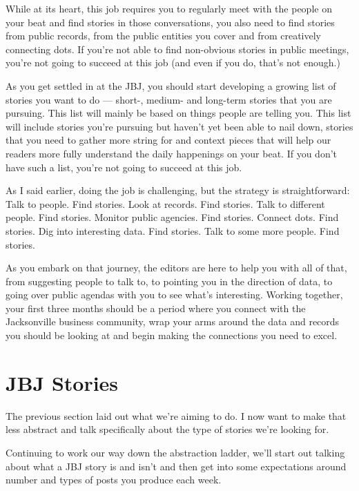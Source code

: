 \documentclass[
  11pt,
  american,
  letterpaperpaper,
  extrafontsizes,onecolumn,openright
  ]{memoir}
\begin{document}
While at its heart, this job requires you to regularly meet with the people on your beat and find stories in those conversations, you also need to find stories from public records, from the public entities you cover and from creatively connecting dots. If you're not able to find non-obvious stories in public meetings, you're not going to succeed at this job (and even if you do, that's not enough.)

As you get settled in at the JBJ, you should start developing a growing list of stories you want to do --- short-, medium- and long-term stories that you are pursuing. This list will mainly be based on things people are telling you. This list will include stories you're pursuing but haven't yet been able to nail down, stories that you need to gather more string for and context pieces that will help our readers more fully understand the daily happenings on your beat. If you don't have such a list, you're not going to succeed at this job.

As I said earlier, doing the job is challenging, but the strategy is straightforward: Talk to people. Find stories. Look at records. Find stories. Talk to different people. Find stories. Monitor public agencies. Find stories. Connect dots. Find stories. Dig into interesting data. Find stories. Talk to some more people. Find stories.

As you embark on that journey, the editors are here to help you with all of that, from suggesting people to talk to, to pointing you in the direction of data, to going over public agendas with you to see what's interesting. Working together, your first three months should be a period where you connect with the Jacksonville business community, wrap your arms around the data and records you should be looking at and begin making the connections you need to excel.

\hypertarget{jbj-stories}{%
\chapter{JBJ Stories}\label{jbj-stories}}

The previous section laid out what we're aiming to do. I now want to make that less abstract and talk specifically about the type of stories we're looking for.

Continuing to work our way down the abstraction ladder, we'll start out talking about what a JBJ story is and isn't and then get into some expectations around number and types of posts you produce each week.
\end{document}

